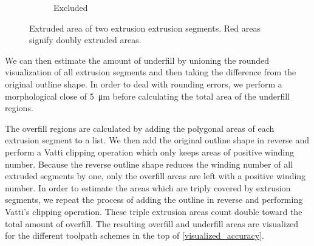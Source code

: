 \begin{figure}
\begin{subfigure}{\figwidth}
\caption{Excluded}
\end{subfigure}
\caption{
Extruded area of two extrusion extrusion segments.
Red areas signify doubly extruded areas.
}
\label{segment_visualization}
\end{figure}

We can then estimate the amount of underfill by unioning the rounded visualization of all extrusion segments and then taking the difference from the original outline shape.
In order to deal with rounding errors, we perform a morphological close of \SI{5}{\micro\meter} before calculating the total area of the underfill regions.

The overfill regions are calculated by adding the polygonal areas of each extrusion segment to a list.
We then add the original outline shape in reverse and perform a Vatti clipping operation \cite{Vatti2019clipping} which only keeps areas of positive winding number.
Because the reverse outline shape reduces the winding number of all extruded segments by one, only the overfill areas are left with a positive winding number.
In order to estimate the areas which are triply covered by extrusion segments, we repeat the process of adding the outline in reverse and performing Vatti's clipping operation.
These triple extrusion areas count double toward the total amount of overfill.
The resulting overfill and underfill areas are visualized for the different toolpath schemes in the top of \cref{visualized_accuracy}.


